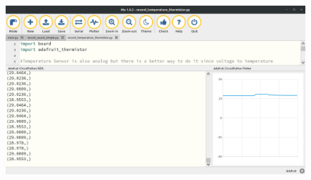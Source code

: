 {\begin{figure}[H]
  \begin{center}
    \includegraphics[width=\textwidth]{Figures/thermistor_mu.png}
  \end{center}
\end{figure}
}
